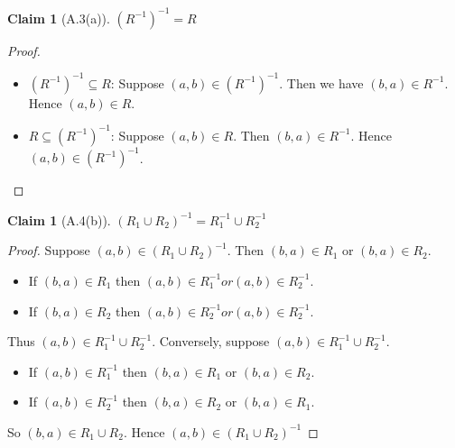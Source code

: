 \documentclass[12pt,aspectratio=169]{beamer}
\theoremstyle{claim}
\newtheorem{claim}[theorem]{Claim}%
\begin{document}
\begin{frame}
    \begin{claim}[A.3(a)]
      $(R^{-1})^{-1} = R$
    \end{claim}
    \begin{proof}
      \begin{itemize}
      \item $(R^{-1})^{-1} \subseteq R$:
      Suppose $(a,b) \in (R^{-1})^{-1}$.
      Then we have $(b,a) \in R^{-1}$.
      Hence $(a,b) \in R$.
  \item $R \subseteq (R^{-1})^{-1}$: Suppose $(a,b) \in R$.
      Then $(b,a) \in R^{-1}$. Hence $(a,b) \in (R^{-1})^{-1}$.
      \end{itemize}
    \end{proof}
\end{frame}

\begin{frame}
    \begin{claim}[A.4(b)]
        $(R_1 \cup R_2)^{-1} = R_1^{-1} \cup R_2^{-1}$
    \end{claim}
    \begin{proof}
        Suppose $(a,b) \in (R_1 \cup R_2)^{-1}$.
        Then $(b,a) \in R_1$ or $(b,a) \in R_2$.
        \begin{itemize}
          \item If $(b,a) \in R_1$ then $(a,b) \in R_1^{-1} or (a,b) \in R_2^{-1}$.
          \item If $(b,a) \in R_2$ then $(a,b) \in R_2^{-1} or (a,b) \in R_2^{-1}$.
        \end{itemize}
        Thus $(a,b) \in R_1^{-1} \cup R_2^{-1}$.
        Conversely, suppose $(a,b) \in R_1^{-1} \cup R_2^{-1}$.
        \begin{itemize}
          \item If $(a,b) \in R_1^{-1}$ then $(b,a) \in R_1$ or $(b,a) \in R_2$.
          \item If $(a,b) \in R_2^{-1}$ then $(b,a) \in R_2$ or $(b,a) \in R_1$.
        \end{itemize}
        So $(b,a) \in R_1 \cup R_2$. Hence $(a,b) \in (R_1 \cup R_2)^{-1}$
    \end{proof}
\end{frame}
\end{document}
